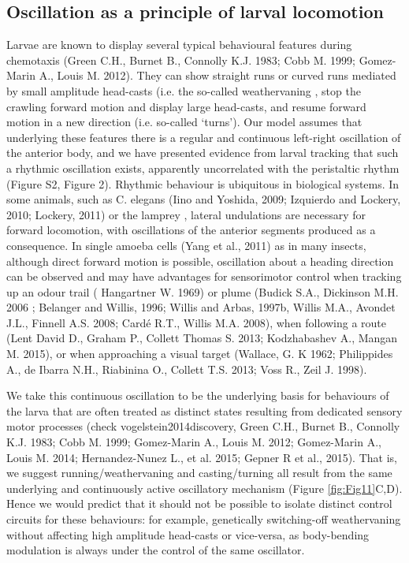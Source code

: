 \documentclass[10pt,a4paper]{article}
\begin{document}
\subsection{Oscillation as a principle of larval locomotion}
Larvae are known to display several typical behavioural features during chemotaxis (Green C.H., Burnet B., Connolly K.J. 1983; Cobb M. 1999; Gomez-Marin A., Louis M. 2012). They can show straight runs or curved runs mediated by small amplitude head-casts (i.e. the so-called weathervaning \cite{iino2009parallel,ohashi2014novel,gomez2014multilevel}, stop the crawling forward motion and display large head-casts, and resume forward motion in a new direction (i.e. so-called ‘turns’). Our model assumes that underlying these features there is a regular and continuous left-right oscillation of the anterior body, and we have presented evidence from larval tracking that such a rhythmic oscillation exists, apparently uncorrelated with the peristaltic rhythm (Figure S2, Figure 2). Rhythmic behaviour is ubiquitous in biological systems. In some animals, such as C. elegans (Iino and Yoshida, 2009; Izquierdo and Lockery, 2010; Lockery, 2011) or the lamprey \citep{lansner1997realistic,wilson1999spikes}, lateral undulations are necessary for forward locomotion, with oscillations of the anterior segments produced as a consequence. In single amoeba cells (Yang et al., 2011) as in many insects, although direct forward motion is possible, oscillation about a heading direction can be observed and may have advantages for sensorimotor control when tracking up an odour trail ( Hangartner W. 1969) or plume (Budick S.A., Dickinson M.H. 2006 ; Belanger and Willis, 1996; Willis and Arbas, 1997b, Willis M.A., Avondet J.L., Finnell A.S. 2008; Cardé R.T., Willis M.A. 2008), when following a route (Lent David D., Graham P., Collett Thomas S. 2013; Kodzhabashev A., Mangan M. 2015), or when approaching a visual target (Wallace, G. K 1962; Philippides A., de Ibarra N.H., Riabinina O., Collett T.S. 2013; Voss R., Zeil J. 1998).

We take this continuous oscillation to be the underlying basis for behaviours of the larva that are often treated as distinct states resulting from dedicated sensory motor processes (check vogelstein2014discovery, Green C.H., Burnet B., Connolly K.J. 1983; Cobb M. 1999; Gomez-Marin A., Louis M. 2012; Gomez-Marin A., Louis M. 2014; Hernandez-Nunez L., et al. 2015; Gepner R et al., 2015). That is, we suggest running/weathervaning and casting/turning all result from the same underlying and continuously active oscillatory mechanism (Figure \ref{fig:Fig11}C,D). Hence we would predict that it should not be possible to isolate distinct control circuits for these behaviours: for example, genetically switching-off weathervaning without affecting high amplitude head-casts or vice-versa, as body-bending modulation is always under the control of the same oscillator. 
\end{document}
